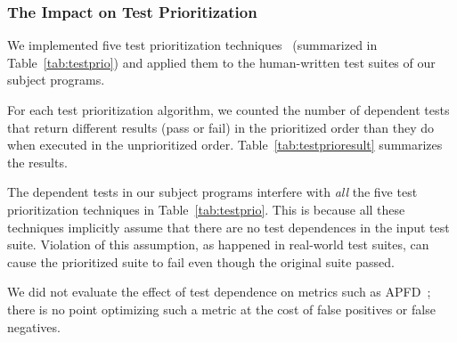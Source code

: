 
\subsubsection{The Impact on Test Prioritization}
\label{sec:impact}

We implemented five test prioritization techniques~\cite{Elbaum:2000:PTC:347324.348910} (summarized in Table~\ref{tab:testprio}) and
applied them to the human-written test suites of our subject programs.


For each test prioritization algorithm, we counted the number
of dependent tests that return different results (pass or fail) in
the prioritized order than they do when executed in the
unprioritized order. Table~\ref{tab:testprioresult} summarizes
the results.

The dependent tests in our subject programs interfere with
\textit{all} the five test prioritization techniques in
Table~\ref{tab:testprio}.
This is because all these techniques
implicitly assume that there are no test dependences in
the input test suite. Violation of this assumption, as
happened in real-world test suites, can cause the prioritized suite to fail
even though the original suite passed.

We did not evaluate the effect of test dependence on metrics such as 
APFD~\cite{Rothermel:1999:TCP:519621.853398}; there is no point optimizing
such a metric at the cost of false positives or false negatives.






